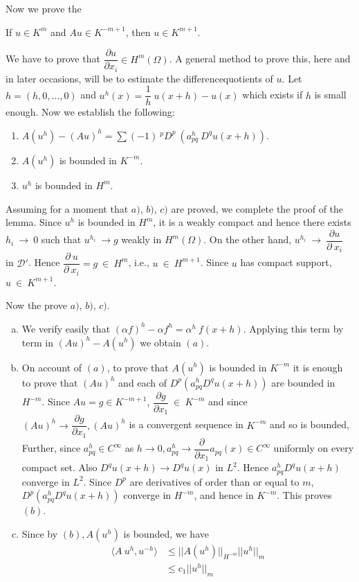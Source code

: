 Now we prove the
\begin{step}\label{lec14:sec8:subsec3:step2}%
If $u \in K^m$ and $Au \in K^{-m+1}$, then $u
\in K^{m+1}$. 
\end{step}

We have to prove that $\dfrac{\partial u}{\partial x_i} \in
H^m(\Omega)$. A general method to prove this, here and in later
occasions, will be to estimate the difference\pageoriginale quotients of $u$. Let $h
= (h,0,\ldots,0)$ and $u^h(x) = \dfrac{1}{h}~ u(x+h) - u(x)$ which
exists if $h$ is small enough. Now we establish the following:  
\begin{enumerate}
\renewcommand{\theenumi}{\alph{enumi}}
\renewcommand{\labelenumi}{\theenumi)}
\item $A(u^h) - (Au)^h = \sum (-1)~  ^{p}D^p ~ (a^h_{pq}~ D^q u(x+h))$.
\item $A(u^h)$ is bounded in $K^{-m}$.
\item $u^h$ is bounded in $H^m$.
\end{enumerate}

Assuming for a moment that $a)$, $b)$, $c)$ are proved, we complete the
proof of the lemma. Since $u^h$ is bounded in $H^m$, it is a weakly
compact and hence there exists $h_i~ \rightarrow ~ 0$ such that
$u^{h_i} ~ \rightarrow g$ weakly in $H^m(\Omega)$. On the other hand,
$u^{h_i} ~ \rightarrow ~ \dfrac{\partial u}{\partial ~x_i}$ in
$\mathscr{D}'$. Hence $\dfrac{\partial~ u}{\partial~ x_i} = g ~
\in~  H^m$, i.e., $u ~ \in ~ H^{m+1}$. Since $u$ has
compact support, $u ~ \in ~ K^{m+1}$. 

Now the prove $a)$, $b)$, $c)$.
\begin{enumerate}[a)]
\item We verify easily that $(\alpha  f)^h - \alpha f^h  =
  \alpha^h ~ f(x+ h)$. Applying this term by term in $(Au)^h -
  A(u^h)$ we obtain $(a)$.  
\item On account of $(a)$, to prove that  $A(u^h)$ is bounded in
  $K^{-m}$ it is enough to prove that $(Au)^h$ and each of
  $D^p(a^h_{pq} D^q u(x+h))$ are bounded in $H^{-m}$. Since $Au = g
  \in K^{-m+1}$, $\dfrac{\partial g}{\partial x_1} ~\in  ~K^{-m}$
  and since $(Au)^h \rightarrow \dfrac{\partial g}{\partial x_1},
  (Au)^h$ is a convergent sequence in $K^{-m}$ and so is bounded,
  Further, since $a^h_{pq} \in C^\infty$ as $h \rightarrow 0,
  a^h_{pq} \rightarrow \dfrac{\partial}{\partial x_1} a_{pq}(x)
  \in C^\infty$ uniformly on every compact set. Also $D^q
  u(x+h) \rightarrow D^q u(x)$ in $L^2$. Hence $a^h_{pq}D^q u(x+h)$
  converge in $L^2$. Since $D^p$ are derivatives of order than or
  equal to $m$, $D^p(a^h_{pq} D^q u(x+h))$ converge in $H^{-m}$, and
  hence in $K^{-m}$. This proves $(b)$.  
\item Since by $(b), A(u^h)$ is bounded, we have
\begin{align*}
\langle A ~ u^h, u^{-h} \rangle & \le || A(u^h) ||_{H^{-m}} || u^h ||_m\\
& \le c_1 || u^h ||_m
\end{align*}
\end{enumerate}

